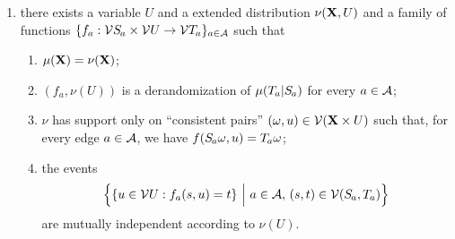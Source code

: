 \documentclass{article}
\begin{document}
\begin{defn}
\begin{enumerate}[label=\textbullet~\textit{q\arabic*-compatible} with $\Ar$ iff, labelwidth=-10em]
        \item 
% 
            
        there exists a variable $U$ and
        a extended distribution $\nu(\mathbf{X}, U)$ and
        a family of functions  
        $\{ f_a : \V\Src a \times \V U \to  \V\Tgt a\}_{a\in \Ar} $ such that
        \begin{enumerate}[label=(\alph*)]
            \item $\mu(\mathbf{X}) = \nu(\mathbf{X})$;
            \item $(f_a, \nu(U))$ is a derandomization 
            of $\mu(\Tgt a | \Src a)$ for every $a \in \mathcal A$;
            \item $\nu$ has support only on ``consistent pairs'' $(\omega, u) \in \mathcal V(\mathbf{X} \times U)$
            such that, for every edge $a \in \mathcal A$, 
            we have $f(\Src a \omega, u) = \Tgt a \omega$;
            \item
            the events 
            \[ 
                \Big\{ \{ u \in \V U : f_a(s,u) = t \} 
                    ~\Big|~a \in \Ar,\, (s,t) \in \V(\Src a, \Tgt a) \Big\}
            \]
            are mutually independent according to $\nu(U)$. 
        \end{enumerate}

    \end{enumerate}
\end{defn}
\end{document}
